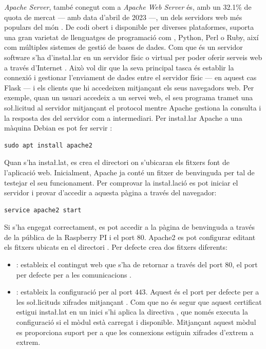 \documentclass{tfgitic}[2022/06/30]
\begin{document}
\emph{Apache  Server}, també conegut com a \emph{Apache Web Server} és, amb un 32.1\% de quota de mercat --- amb data d'abril de 2023 ---,  un dels servidors web més populars del món \cite{w3techs:webservers}. De codi obert i disponible per diverses plataformes, suporta una gran varietat de llenguatges de programació com , Python, Perl o Ruby, així com múltiples sistemes de gestió de bases de dades. Com que és un servidor software s'ha d'insta\l.lar en un servidor físic o virtual per poder oferir serveis web a través d'Internet \cite{apache}. Això vol dir que la seva principal tasca és establir la connexió i gestionar l'enviament de dades entre el servidor físic --- en aquest cas Flask --- i els clients que hi accedeixen mitjançant els seus navegadors web. Per exemple, quan un usuari accedeix a un servei web, el seu programa tramet una so\l.licitud al servidor mitjançant el protocol  mentre Apache gestiona la consulta i la resposta des del servidor com a intermediari. Per insta\l.lar Apache a una màquina Debian es pot fer servir :

\begin{lstlisting}[style = bash]
sudo apt install apache2
\end{lstlisting}

Quan s'ha insta\l.lat, es crea el directori  on s'ubicaran els fitxers font de l'aplicació web. Inicialment, Apache ja conté un fitxer  de benvinguda per tal de testejar el seu funcionament. Per comprovar la insta\l.lació es pot iniciar el servidor i provar d'accedir a aquesta pàgina a través del navegador:

\begin{lstlisting}[style = bash]
service apache2 start
\end{lstlisting}

Si s'ha engegat correctament, es pot accedir a la pàgina de benvinguda a través de la  pública de la Raspberry PI i el port 80. Apache2 es pot configurar editant els fitxers ubicats en el directori . Per defecte crea dos fitxers diferents:

\begin{itemize}
    \item {}: estableix el contingut web que s'ha de retornar a través del port $80$, el port per defecte per a les comunicacions .
    \item {}: estableix la configuració per al port $443$. Aquest és el port per defecte per a les so\l.licituds  xifrades mitjançant . Com que no és segur que aquest certificat estigui insta\l.lat en un inici s'hi aplica la directiva , que només executa la configuració si el mòdul  està carregat i disponible. Mitjançant aquest mòdul es proporciona suport per a que les connexions estiguin xifrades d'extrem a extrem.
\end{itemize}
\end{document}
